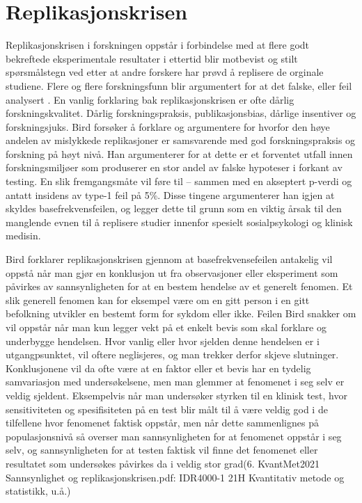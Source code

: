 \documentclass[
]{book}
\begin{document}
\hypertarget{replikasjonskrisen}{%
\section{Replikasjonskrisen}\label{replikasjonskrisen}}

Replikasjonskrisen i forskningen oppstår i forbindelse med at flere godt bekreftede eksperimentale resultater i ettertid blir motbevist og stilt spørsmålstegn ved etter at andre forskere har prøvd å replisere de orginale studiene\citep{bird2020}. Flere og flere forskningsfunn blir argumentert for at det falske, eller feil analysert \citep{dalen-lorentsen2020, ioannidis2005}. En vanlig forklaring bak replikasjonskrisen er ofte dårlig forskningskvalitet. Dårlig forskningspraksis, publikasjonsbias, dårlige insentiver og forskningsjuks\citep{fanelli2009, joober2012}. Bird forsøker å forklare og argumentere for hvorfor den høye andelen av mislykkede replikasjoner er samsvarende med god forskningspraksis og forskning på høyt nivå\citep{bird2020}. Han argumenterer for at dette er et forventet utfall innen forskningsmiljøer som produserer en stor andel av falske hypoteser i forkant av testing. En slik fremgangsmåte vil føre til -- sammen med en akseptert p-verdi og antatt insidens av type-1 feil på 5\%. Disse tingene argumenterer han igjen at skyldes basefrekvensfeilen, og legger dette til grunn som en viktig årsak til den manglende evnen til å replisere studier innenfor spesielt sosialpsykologi og klinisk medisin\citep{bird2020}.

Bird forklarer replikasjonskrisen gjennom at basefrekvensefeilen antakelig vil oppstå når man gjør en konklusjon ut fra observasjoner eller eksperiment som påvirkes av sannsynligheten for at en bestem hendelse av et generelt fenomen. Et slik generell fenomen kan for eksempel være om en gitt person i en gitt befolkning utvikler en bestemt form for sykdom eller ikke. Feilen Bird snakker om vil oppstår når man kun legger vekt på et enkelt bevis som skal forklare og underbygge hendelsen. Hvor vanlig eller hvor sjelden denne hendelsen er i utgangpsunktet, vil oftere neglisjeres, og man trekker derfor skjeve slutninger. Konklusjonene vil da ofte være at en faktor eller et bevis har en tydelig samvariasjon med undersøkelsene, men man glemmer at fenomenet i seg selv er veldig sjeldent. Eksempelvis når man undersøker styrken til en klinisk test, hvor sensitiviteten og spesifisiteten på en test blir målt til å være veldig god i de tilfellene hvor fenomenet faktisk oppstår, men når dette sammenlignes på populasjonsnivå så overser man sannsynligheten for at fenomenet oppstår i seg selv, og sannsynligheten for at testen faktisk vil finne det fenomenet eller resultatet som undersøkes påvirkes da i veldig stor grad(6. KvantMet2021 Sannsynlighet og replikasjonskrisen.pdf: IDR4000-1 21H Kvantitativ metode og statistikk, u.å.)
\end{document}
